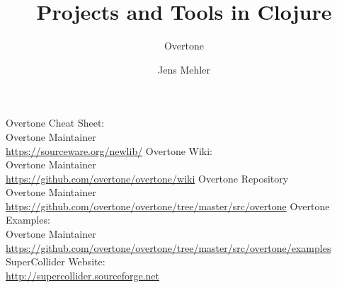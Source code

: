 \documentclass[11pt,a4paper]{report}
\begin{document}
\title{Projects and Tools in Clojure}
\subtitle{Overtone}
\author{Jens Mehler}

\maketitle
\newpage
\tableofcontents



\newpage

\newpage
\thispagestyle{empty}
\glsaddall
\printglossaries

\newpage
\thispagestyle{empty}
\listoffigures

\newpage
\thispagestyle{empty}
\listoftables

\newpage
\thispagestyle{empty}
\begin{thebibliography}{0}

Overtone Cheat Sheet:\\ Overtone Maintainer \\ \url{https://sourceware.org/newlib/}
Overtone Wiki:\\ Overtone Maintainer \\ \url{https://github.com/overtone/overtone/wiki}
Overtone Repository \\ Overtone Maintainer \\ \url{https://github.com/overtone/overtone/tree/master/src/overtone}
Overtone Examples:\\ Overtone Maintainer \\ \url{https://github.com/overtone/overtone/tree/master/src/overtone/examples}
SuperCollider Website:\\ \url{http://supercollider.sourceforge.net}

\end{thebibliography}
\end{document}

